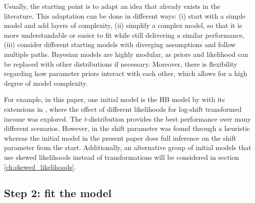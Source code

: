 Usually, the starting point is to adapt an idea that already exists in the literature.
This adaptation can be done in different ways: (i) start with a simple model and add layers of complexity, (ii) simplify a complex model, so that it is more understandable or easier to fit while still delivering a similar performance, (iii) consider different starting models with diverging assumptions and follow multiple paths.
Bayesian models are highly modular, as priors and likelihood can be replaced with other distributions if necessary.
Moreover, there is flexibility regarding how parameter priors interact with each other, which allows for a high degree of model complexity.


For example, in this paper, one initial model is the HB model by \cite{molina_small_2014} with its extensions in \cite{morelli_hierarchical_2021}, where the effect of different likelihoods for log-shift transformed income was explored.
The $t$-distribution provides the best performance over many different scenarios.
However, in \cite{morelli_hierarchical_2021} the shift parameter was found through a heuristic whereas
the initial model in the present paper does full inference on the shift parameter from the start.
Additionally, an alternative group of initial models that use skewed likelihoods instead of transformations will be considered in section \ref{ch:skewed_likelihoods}.


\subsection{Step 2: fit the model}

